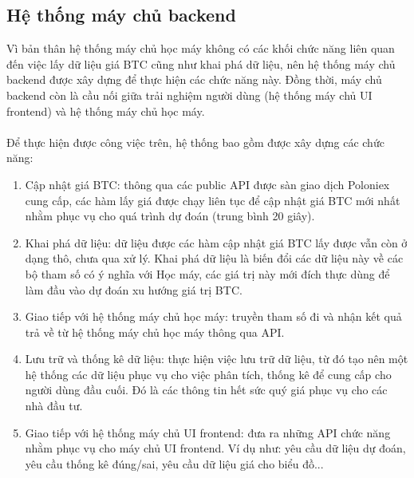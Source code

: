 \subsection{ Hệ thống máy chủ backend}
Vì bản thân hệ thống máy chủ học máy không có các khối chức năng liên quan đến 
việc lấy dữ liệu giá BTC cũng như khai phá dữ liệu, nên hệ thống máy chủ backend 
được xây dựng để thực hiện các chức năng này. Đồng thời, máy chủ backend còn là 
cầu nối giữa trải nghiệm người dùng (hệ thống máy chủ UI frontend) và hệ thống 
máy chủ học máy.\\\\
Để thực hiện được công việc trên, hệ thống bao gồm được xây dựng các chức năng:
\begin{enumerate}
\item Cập nhật giá BTC: thông qua các public API được sàn giao dịch Poloniex 
cung cấp, các hàm lấy giá được chạy liên tục để cập nhật giá BTC mới nhất nhằm 
phục vụ cho quá trình dự đoán (trung bình 20 giây).
\item Khai phá dữ liệu: dữ liệu được các hàm cập nhật giá BTC lấy được vẫn 
còn ở dạng thô, chưa qua xử lý. Khai phá dữ liệu là biến đổi các dữ liệu này 
về các bộ tham số có ý nghĩa với Học máy, các giá trị này mới đích thực 
dùng để làm đầu vào dự đoán xu hướng giá trị BTC.
\item Giao tiếp với hệ thống máy chủ học máy: truyền tham số đi và nhận 
kết quả trả về từ hệ thống máy chủ học máy thông qua API.
\item Lưu trữ và thống kê dữ liệu: thực hiện việc lưu trữ dữ liệu, từ đó tạo 
nên một hệ thống các dữ liệu phục vụ cho việc phân tích, thống kê để cung cấp 
cho người dùng đầu cuối. Đó là các thông tin hết sức quý giá phục vụ cho các 
nhà đầu tư.
\item Giao tiếp với hệ thống máy chủ UI frontend: đưa ra những API chức năng 
nhằm phục vụ cho máy chủ UI frontend. Ví dụ như: yêu cầu dữ liệu dự đoán, yêu 
cầu thống kê đúng/sai, yêu cầu dữ liệu giá cho biểu đồ...
\end{enumerate}
